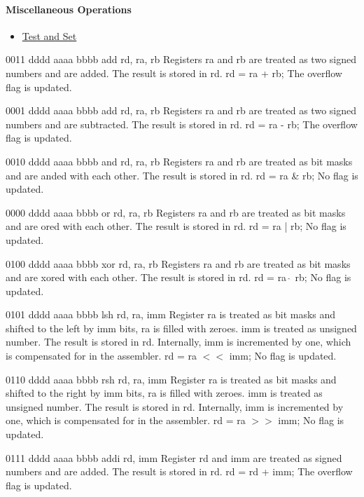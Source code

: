 \paragraph{Miscellaneous Operations}
\begin{itemize}
\nolistskip
\item \hyperref[instr_tst]{Test and Set}
\end{itemize}

	{0011 dddd aaaa bbbb}
	{add rd, ra, rb}
	{Registers ra and rb are treated as two signed numbers and are added. The result is stored in rd.}
	{rd = ra + rb;}
	{The overflow flag is updated.}

	{0001 dddd aaaa bbbb}
	{add rd, ra, rb}
	{Registers ra and rb are treated as two signed numbers and are subtracted. The result is stored in rd.}
	{rd = ra - rb;}
	{The overflow flag is updated.}
	
	{0010 dddd aaaa bbbb}
	{and rd, ra, rb}
	{Registers ra and rb are treated as bit masks and are anded with each other. The result is stored in rd.}
	{rd = ra \& rb;}
	{No flag is updated.}

	{0000 dddd aaaa bbbb}
	{or rd, ra, rb}
	{Registers ra and rb are treated as bit masks and are ored with each other. The result is stored in rd.}
	{rd = ra | rb;}
	{No flag is updated.}

	{0100 dddd aaaa bbbb}
	{xor rd, ra, rb}
	{Registers ra and rb are treated as bit masks and are xored with each other. The result is stored in rd.}
	{rd = ra $\hat\ $ rb;}
	{No flag is updated.}
	
	{0101 dddd aaaa bbbb}
	{lsh rd, ra, imm}
	{Register ra is treated as bit masks and shifted to the left by imm bits, ra is filled with zeroes. imm is treated as unsigned number. The result is stored in rd. Internally, imm is incremented by one, which is compensated for in the assembler.}
	{rd = ra $<<$ imm;}
	{No flag is updated.}
	
	{0110 dddd aaaa bbbb}
	{rsh rd, ra, imm}
	{Register ra is treated as bit masks and shifted to the right by imm bits, ra is filled with zeroes. imm is treated as unsigned number. The result is stored in rd. Internally, imm is incremented by one, which is compensated for in the assembler.}
	{rd = ra $>>$ imm;}
	{No flag is updated.}

	{0111 dddd aaaa bbbb}
	{addi rd, imm}
	{Register rd and imm are treated as signed numbers and are added. The result is stored in rd.}
	{rd = rd + imm;}
	{The overflow flag is updated.}

